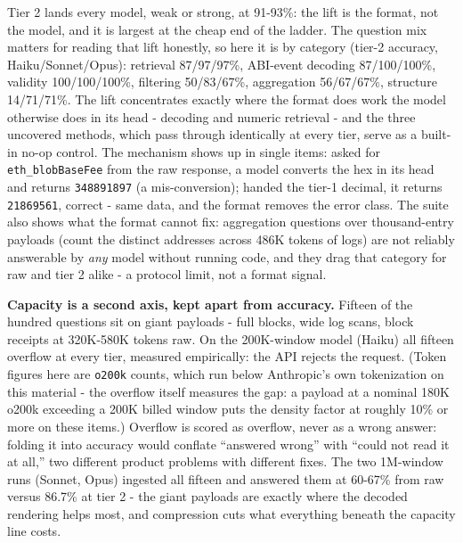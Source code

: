 \documentclass[11pt]{article}
\newcommand{\code}[1]{\texttt{#1}}
\begin{document}
Tier 2 lands every model, weak or strong, at 91-93\%: the lift is the format, not the model, and it is largest at the cheap end of the ladder. The question mix matters for reading that lift honestly, so here it is by category (tier-2 accuracy, Haiku/Sonnet/Opus): retrieval 87/97/97\%, ABI-event decoding 87/100/100\%, validity 100/100/100\%, filtering 50/83/67\%, aggregation 56/67/67\%, structure 14/71/71\%. The lift concentrates exactly where the format does work the model otherwise does in its head - decoding and numeric retrieval - and the three uncovered methods, which pass through identically at every tier, serve as a built-in no-op control. The mechanism shows up in single items: asked for \code{eth\_blobBaseFee} from the raw response, a model converts the hex in its head and returns \code{348891897} (a mis-conversion); handed the tier-1 decimal, it returns \code{21869561}, correct - same data, and the format removes the error class. The suite also shows what the format cannot fix: aggregation questions over thousand-entry payloads (count the distinct addresses across 486K tokens of logs) are not reliably answerable by \emph{any} model without running code, and they drag that category for raw and tier 2 alike - a protocol limit, not a format signal.

\textbf{Capacity is a second axis, kept apart from accuracy.} Fifteen of the hundred questions sit on giant payloads - full blocks, wide log scans, block receipts at 320K-580K tokens raw. On the 200K-window model (Haiku) all fifteen overflow at every tier, measured empirically: the API rejects the request. (Token figures here are \code{o200k} counts, which run below Anthropic's own tokenization on this material - the overflow itself measures the gap: a payload at a nominal 180K o200k exceeding a 200K billed window puts the density factor at roughly 10\% or more on these items.) Overflow is scored as overflow, never as a wrong answer: folding it into accuracy would conflate ``answered wrong'' with ``could not read it at all,'' two different product problems with different fixes. The two 1M-window runs (Sonnet, Opus) ingested all fifteen and answered them at 60-67\% from raw versus 86.7\% at tier 2 - the giant payloads are exactly where the decoded rendering helps most, and compression cuts what everything beneath the capacity line costs.
\end{document}
